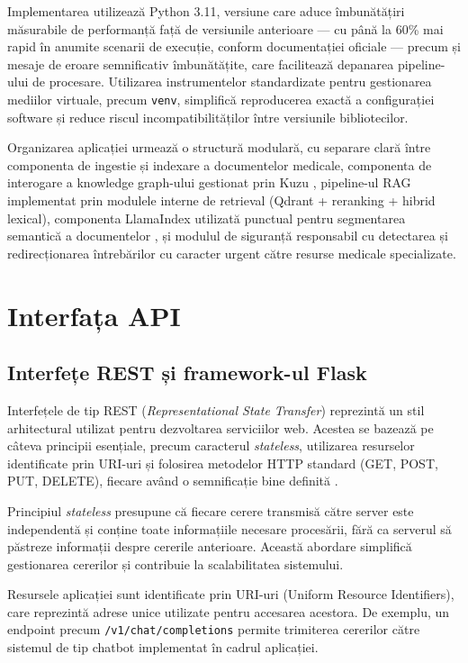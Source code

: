 \documentclass[12pt, a4paper, oneside, romanian]{teza-upb}
\begin{document}
Implementarea utilizează Python 3.11, versiune care aduce îmbunătățiri măsurabile
de performanță față de versiunile anterioare — cu până la 60\% mai rapid în anumite
scenarii de execuție, conform documentației oficiale \cite{python311} — precum și
mesaje de eroare semnificativ îmbunătățite, care facilitează depanarea pipeline-ului
de procesare. Utilizarea instrumentelor standardizate pentru gestionarea mediilor
virtuale, precum \texttt{venv}, simplifică reproducerea exactă
a configurației software și reduce riscul incompatibilităților între versiunile
bibliotecilor.

Organizarea aplicației urmează o structură modulară, cu separare clară între
componenta de ingestie și indexare a documentelor medicale, componenta de
interogare a knowledge graph-ului gestionat prin Kuzu \cite{kuzu_doc}, pipeline-ul RAG implementat
prin modulele interne de retrieval (Qdrant + reranking + hibrid lexical), componenta
LlamaIndex utilizată punctual pentru segmentarea semantică a documentelor \cite{llamaindex_doc},
și modulul de siguranță responsabil cu detectarea și redirecționarea întrebărilor
cu caracter urgent către resurse medicale specializate.


\section{Interfața API}

\subsection{Interfețe REST și framework-ul Flask}

Interfețele de tip REST (\textit{Representational State Transfer}) reprezintă un stil arhitectural utilizat pentru dezvoltarea serviciilor web. Acestea se bazează pe câteva principii esențiale, precum caracterul \textit{stateless}, utilizarea resurselor identificate prin URI-uri și folosirea metodelor HTTP standard (GET, POST, PUT, DELETE), fiecare având o semnificație bine definită \cite{fielding2000rest}.

Principiul \textit{stateless} presupune că fiecare cerere transmisă către server este independentă și conține toate informațiile necesare procesării, fără ca serverul să păstreze informații despre cererile anterioare. Această abordare simplifică gestionarea cererilor și contribuie la scalabilitatea sistemului.

Resursele aplicației sunt identificate prin URI-uri (Uniform Resource Identifiers), care reprezintă adrese unice utilizate pentru accesarea acestora. De exemplu, un endpoint precum \texttt{/v1/chat/completions} permite trimiterea cererilor către sistemul de tip chatbot implementat în cadrul aplicației.
\end{document}
